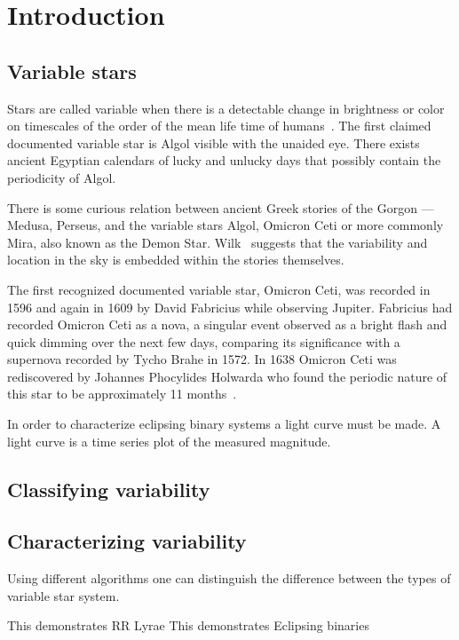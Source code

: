 \chapter{Introduction}\label{ch:intro}

\section{Variable stars}
Stars are called variable when there is a detectable change in brightness or color on timescales of the order of the mean life time of humans~\cite{percy_2007, sterken_1996}.
The first claimed documented variable star is Algol visible with the unaided eye.
There exists ancient Egyptian calendars of lucky and unlucky days that possibly contain the periodicity of Algol\cite{porceddu_2008}.

There is some curious relation between ancient Greek stories of the Gorgon --- Medusa, Perseus, and the variable stars Algol, Omicron Ceti
or more commonly Mira, also known as the Demon Star.
Wilk~\cite{wilk_1996} suggests that the variability and location in the sky is embedded within the stories themselves.

The first recognized documented variable star, Omicron Ceti,  was recorded in 1596 and again in 1609 by David Fabricius while observing Jupiter.
Fabricius had recorded Omicron Ceti as a nova, a singular event observed as a bright flash and quick dimming over the next few days,
comparing its significance with a supernova recorded by Tycho Brahe in 1572.
In 1638 Omicron Ceti was rediscovered by Johannes Phocylides Holwarda who found the periodic nature of this star to be approximately 11 months~\cite{hockey_2007}.

In order to characterize eclipsing binary systems a light curve must be made.
A light curve is a time series plot of the measured magnitude.

\section{Classifying variability}


\section{Characterizing variability}
Using different algorithms one can distinguish the difference between the types of variable star system.

This demonstrates RR Lyrae
This demonstrates Eclipsing binaries

